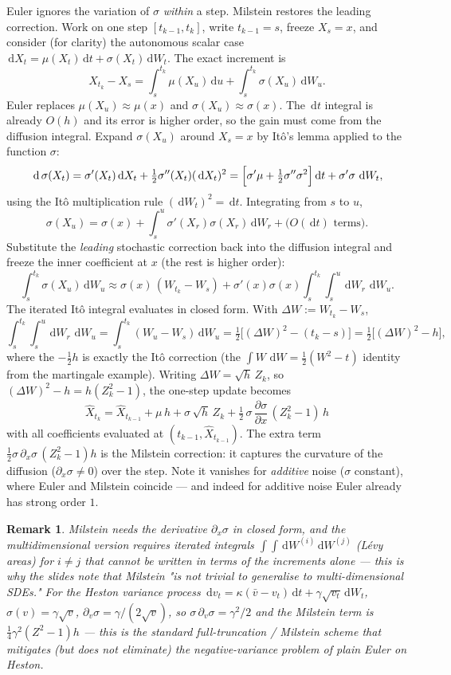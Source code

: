 \documentclass[11pt]{article}
\newcommand{\dd}{\,\mathrm{d}}
\newtheorem{remark}{Remark}
\begin{document}
Euler ignores the variation of $\sigma$ \emph{within} a step. Milstein restores the
leading correction. Work on one step $[t_{k-1},t_k]$, write $t_{k-1}=s$, freeze
$X_s=x$, and consider (for clarity) the autonomous scalar case
$\dd X_t=\mu(X_t)\dd t+\sigma(X_t)\dd W_t$. The exact increment is
\[
X_{t_k}-X_s=\int_s^{t_k}\mu(X_u)\dd u+\int_s^{t_k}\sigma(X_u)\dd W_u.
\]
Euler replaces $\mu(X_u)\approx\mu(x)$ and $\sigma(X_u)\approx\sigma(x)$. The
$\dd t$ integral is already $O(h)$ and its error is higher order, so the gain must come
from the diffusion integral. Expand $\sigma(X_u)$ around $X_s=x$ by Itô's lemma applied
to the function $\sigma$:
\[
\dd\,\sigma(X_t)=\sigma'(X_t)\dd X_t+\tfrac12\sigma''(X_t)(\dd X_t)^2
=\Bigl[\sigma'\mu+\tfrac12\sigma''\sigma^2\Bigr]\dd t+\sigma'\sigma\,\dd W_t,
\]
using the Itô multiplication rule $(\dd W_t)^2=\dd t$. Integrating from $s$ to $u$,
\[
\sigma(X_u)=\sigma(x)+\int_s^u\sigma'(X_r)\sigma(X_r)\dd W_r+\big(\text{$O(\dd t)$ terms}\big).
\]
Substitute the \emph{leading} stochastic correction back into the diffusion integral and
freeze the inner coefficient at $x$ (the rest is higher order):
\[
\int_s^{t_k}\sigma(X_u)\dd W_u
\approx\sigma(x)\,(W_{t_k}-W_s)
+\sigma'(x)\sigma(x)\int_s^{t_k}\!\!\int_s^u \dd W_r\,\dd W_u.
\]
The iterated Itô integral evaluates in closed form. With $\Delta W:=W_{t_k}-W_s$,
\[
\int_s^{t_k}\!\!\int_s^u \dd W_r\,\dd W_u
=\int_s^{t_k}(W_u-W_s)\dd W_u
=\tfrac12\bigl[(\Delta W)^2-(t_k-s)\bigr]
=\tfrac12\bigl[(\Delta W)^2-h\bigr],
\]
where the $-\tfrac12 h$ is exactly the Itô correction (the $\int W\,\dd W=\tfrac12(W^2-t)$
identity from the martingale example). Writing $\Delta W=\sqrt h\,Z_k$, so
$(\Delta W)^2-h=h(Z_k^2-1)$, the one-step update becomes
\[
\boxed{\;\widehat X_{t_k}=\widehat X_{t_{k-1}}+\mu\,h+\sigma\,\sqrt h\,Z_k
+\tfrac12\,\sigma\,\frac{\partial\sigma}{\partial x}\,(Z_k^2-1)\,h\;}
\]
with all coefficients evaluated at $(t_{k-1},\widehat X_{t_{k-1}})$. The extra term
$\tfrac12\sigma\,\partial_x\sigma\,(Z_k^2-1)h$ is the Milstein correction: it captures
the curvature of the diffusion ($\partial_x\sigma\ne0$) over the step. Note it vanishes
for \emph{additive} noise ($\sigma$ constant), where Euler and Milstein coincide --- and
indeed for additive noise Euler already has strong order $1$.

\begin{remark}
Milstein needs the derivative $\partial_x\sigma$ in closed form, and the
multidimensional version requires iterated integrals
$\int\!\int\dd W^{(i)}\dd W^{(j)}$ (Lévy areas) for $i\ne j$ that cannot be written in
terms of the increments alone --- this is why the slides note that Milstein "is not
trivial to generalise to multi-dimensional SDEs." For the Heston variance process
$\dd v_t=\kappa(\bar v-v_t)\dd t+\gamma\sqrt{v_t}\dd W_t$, $\sigma(v)=\gamma\sqrt v$,
$\partial_v\sigma=\gamma/(2\sqrt v)$, so $\sigma\,\partial_v\sigma=\gamma^2/2$ and the
Milstein term is $\tfrac14\gamma^2(Z^2-1)h$ --- this is the standard full-truncation /
Milstein scheme that mitigates (but does not eliminate) the negative-variance problem of
plain Euler on Heston.
\end{remark}
\end{document}
